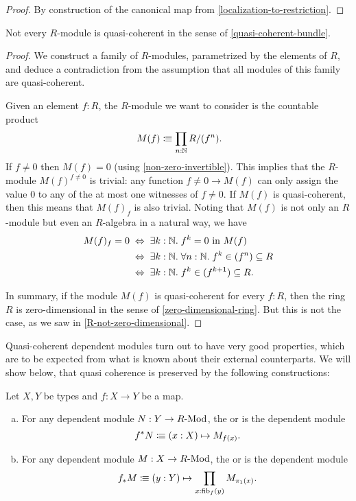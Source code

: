 \begin{proof}
  By construction of the canonical map from \cref{localization-to-restriction}.
\end{proof}

\begin{proposition}
  Not every $R$-module is quasi-coherent
  in the sense of \cref{quasi-coherent-bundle}.
\end{proposition}

\begin{proof}
  We construct a family of $R$-modules,
  parametrized by the elements of $R$,
  and deduce a contradiction from the assumption that
  all modules of this family are quasi-coherent.

  Given an element $f : R$,
  the $R$-module we want to consider is
  the countable product
  \[ M(f) \colonequiv \prod_{n : \N} R/(f^n) \rlap{.} \]
  If $f \neq 0$ then $M(f) = 0$
  (using \cref{non-zero-invertible}).
  This implies that the $R$-module $M(f)^{f \neq 0}$
  is trivial:
  any function $f \neq 0 \to M(f)$ can only assign the value $0$
  to any of the at most one witnesses of $f \neq 0$.
  If $M(f)$ is quasi-coherent,
  then this means that $M(f)_f$ is also trivial.
  Noting that
  $M(f)$ is not only an $R$-module
  but even an $R$-algebra in a natural way,
  we have
  \begin{align*}
    M(f)_f = 0
    &\;\Leftrightarrow\;
    \exists k : \N.\; \text{$f^k = 0$ in $M(f)$} \\
    &\;\Leftrightarrow\;
    \exists k : \N.\; \forall n : \N.\; f^k \in (f^n) \subseteq R \\
    &\;\Leftrightarrow\;
    \exists k : \N.\; f^k \in (f^{k + 1}) \subseteq R
    \rlap{.}
  \end{align*}

  In summary,
  if the module $M(f)$ is quasi-coherent
  for every $f : R$,
  then the ring $R$ is zero-dimensional
  in the sense of \cref{zero-dimensional-ring}.
  But this is not the case,
  as we saw in \cref{R-not-zero-dimensional}.
\end{proof}

Quasi-coherent dependent modules turn out to have very good properties,
which are to be expected from what is known about their external counterparts.
We will show below, that quasi coherence is preserved by the following constructions:

\begin{definition}
  \label{pullback-push-forward}
  Let $X,Y$ be types and $f:X\to Y$ be a map.
  \begin{enumerate}[(a)]
  \item {} For any dependent module $N:Y\to R\text{-}\mathrm{Mod}$,
    the  or  is the dependent module
    \[
      f^*N\colonequiv (x:X) \mapsto M_{f(x)}\rlap{.}
    \]
  \item {} For any dependent module $M:X\to R\text{-}\mathrm{Mod}$,
    the  or  is the dependent module
    \[
      f_*M\colonequiv (y:Y) \mapsto \prod_{x:\fib_f(y)}M_{\pi_1(x)}\rlap{.}
    \]
  \end{enumerate}
\end{definition}

